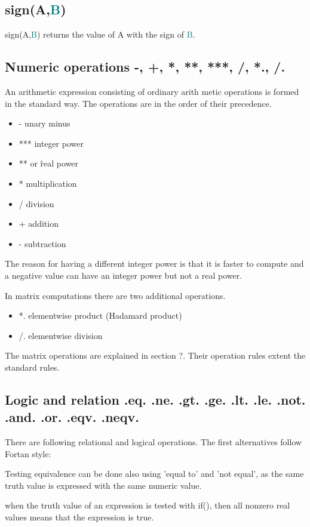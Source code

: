 {\begin{itemize}
\begin{itemize}
\subsection{\textcolor{VioletRed}{sign}(A,\textcolor{teal}{B})} 
\label{sign} 
\textcolor{VioletRed}{sign}(A,\textcolor{teal}{B}) returns the value of A with the sign of \textcolor{teal}{B}. 
\subsection{Numeric operations -, +, *, **, ***, /, *., /.} 
\label{numer} 
An arithmetic expression consisting of ordinary arith metic operations is formed in 
the standard way. The operations are in the order of their precedence. 
\begin{itemize} 
\item - unary minus 
\item *** integer power 
\item ** or \^ real power 
\item * multiplication 
\item / division 
\item + addition 
\item - subtraction 
\end{itemize} 
 
The reason for having a different integer power is that it is faster to compute and a negative 
value can have an integer power but not a real power. 
 
In matrix computations there are two additional operations. 
 
 
\begin{itemize} 
\item *. elementwise product (Hadamard product) 
\item /. elementwise division 
\end{itemize} 
 
 
The matrix operations are explained in section ?. Their operation rules extent 
the standard rules. 
\subsection{Logic and relation .eq. .ne. .gt. .ge. .lt. .le. .not. .and. .or. .eqv. .neqv.} 
\label{logic} 
There are following relational and logical operations. The first alternatives 
follow Fortan style: 
 
 
\begin{note} 
Testing equivalence can be done also using 'equal to' and 'not equal', as the same truth 
value is expressed with the same numeric value. 
\end{note} 
\begin{note} 
when the truth value of an expression is tested with \textcolor{VioletRed}{if}(), then all nonzero real values 
means that the expression is true. 
\end{note} 
 

\end{itemize}
\end{itemize}}

